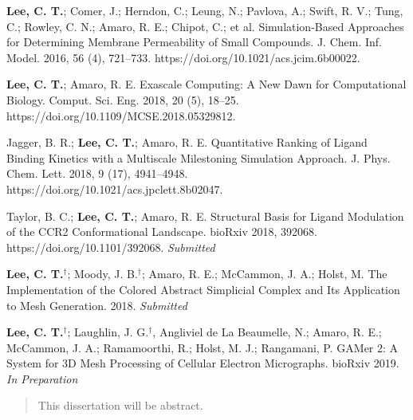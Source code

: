 \begin{frontmatter}
\begin{vitapage}
\begin{publications}
  \item \textbf{Lee, C. T.}; Comer, J.; Herndon, C.; Leung, N.; Pavlova, A.; Swift, R. V.; Tung, C.; Rowley, C. N.; Amaro, R. E.; Chipot, C.; et al. Simulation-Based Approaches for Determining Membrane Permeability of Small Compounds. J. Chem. Inf. Model. 2016, 56 (4), 721–733. https://doi.org/10.1021/acs.jcim.6b00022.
  \item \textbf{Lee, C. T.}; Amaro, R. E. Exascale Computing: A New Dawn for Computational Biology. Comput. Sci. Eng. 2018, 20 (5), 18–25. https://doi.org/10.1109/MCSE.2018.05329812.
  \item Jagger, B. R.; \textbf{Lee, C. T.}; Amaro, R. E. Quantitative Ranking of Ligand Binding Kinetics with a Multiscale Milestoning Simulation Approach. J. Phys. Chem. Lett. 2018, 9 (17), 4941–4948.\\ https://doi.org/10.1021/acs.jpclett.8b02047.
  \item Taylor, B. C.; \textbf{Lee, C. T.}; Amaro, R. E. Structural Basis for Ligand Modulation of the CCR2 Conformational Landscape. bioRxiv 2018, 392068. https://doi.org/10.1101/392068. \textit{Submitted}
  \item \textbf{Lee, C. T.$^{\dagger}$}; Moody, J. B.$^{\dagger}$; Amaro, R. E.; McCammon, J. A.; Holst, M. The Implementation of the Colored Abstract Simplicial Complex and Its Application to Mesh Generation. 2018. \textit{Submitted}
  \item \textbf{Lee, C. T.$^{\dagger}$}; Laughlin, J. G.$^{\dagger}$, Angliviel de La Beaumelle, N.; Amaro, R. E.; McCammon, J. A.; Ramamoorthi, R.; Holst, M. J.; Rangamani, P. GAMer 2: A System for 3D Mesh Processing of Cellular Electron Micrographs. bioRxiv 2019. \textit{In Preparation}
\end{publications}
\end{vitapage}

%
%
\begin{abstract}
  This dissertation will be abstract.
\end{abstract}

\end{frontmatter}
